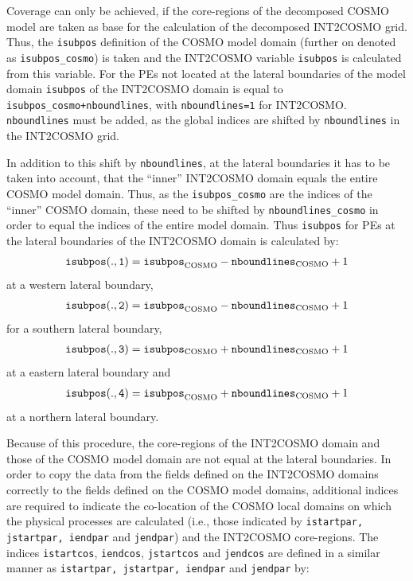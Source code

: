 \documentclass[11pt,twoside]{article}
\begin{document}
Coverage can only be achieved, if the core-regions of the decomposed COSMO 
model are taken as base for the calculation of the decomposed INT2COSMO grid.
Thus, the \verb|isubpos| definition of the COSMO model domain (further on
denoted as \verb|isubpos_cosmo|) is taken and the INT2COSMO variable 
\verb|isubpos| is calculated from this variable.
For the PEs not located at the lateral boundaries of the model domain 
\verb|isubpos| of the INT2COSMO domain is equal to 
\verb|isubpos_cosmo+nboundlines|, with \verb|nboundlines=1| for INT2COSMO.
\verb|nboundlines| must be added, as the global indices are shifted by 
\verb|nboundlines| in the INT2COSMO grid.

In addition to this shift by \verb|nboundlines|, at the lateral boundaries it has
 to be taken into account, that the ``inner''
 INT2COSMO domain equals the entire COSMO model domain. Thus, as the 
\verb|isubpos_cosmo| are the indices of the ``inner'' COSMO domain, these need
to be shifted by \verb|nboundlines_cosmo| in order to equal the indices of the
 entire model domain.
Thus \verb|isubpos| for PEs at the lateral boundaries of the INT2COSMO domain is 
calculated by:
\begin{eqnarray*}
{\tt isubpos(.,1)} = {\tt isubpos}_{\rm COSMO} - {\tt nboundlines}_{\rm COSMO} + 1 
\end{eqnarray*} 
at a western lateral boundary,
\begin{eqnarray*}
{\tt isubpos(.,2)} = {\tt isubpos}_{\rm COSMO} - {\tt nboundlines}_{\rm COSMO} + 1 
\end{eqnarray*} 
for a southern lateral boundary,
\begin{eqnarray*}
 {\tt isubpos(.,3)} = {\tt isubpos_{\rm COSMO}} +  {\tt nboundlines}_{\rm COSMO} +1
\end{eqnarray*} 
at a eastern lateral boundary and
\begin{eqnarray*}
 {\tt isubpos(.,4)} = {\tt isubpos}_{\rm COSMO} +  {\tt nboundlines}_{\rm COSMO} +1
\end{eqnarray*} 
at a northern lateral boundary.

Because of this procedure, the core-regions of the INT2COSMO domain and those
of the COSMO model domain are not equal at the lateral boundaries.
In order to copy the data from the fields defined on the INT2COSMO domains
correctly to the fields defined on the COSMO model domains, additional indices
are required to indicate the co-location of the COSMO local domains
 on which the physical processes are calculated (i.e., those indicated by
\verb|istartpar, jstartpar, iendpar| and \verb|jendpar|) and the INT2COSMO 
core-regions. The indices \verb|istartcos|, \verb|iendcos|, 
\verb|jstartcos| and \verb|jendcos| are defined in a similar manner as 
\verb|istartpar, jstartpar, iendpar| and \verb|jendpar| by:
\end{document}
